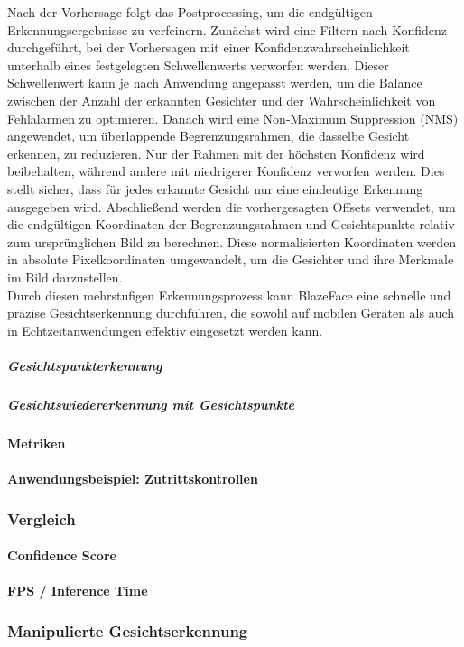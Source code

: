 Nach der Vorhersage folgt das Postprocessing, um die endgültigen Erkennungsergebnisse zu verfeinern. Zunächst wird eine Filtern nach Konfidenz durchgeführt, bei der Vorhersagen mit einer Konfidenzwahrscheinlichkeit unterhalb eines festgelegten Schwellenwerts verworfen werden. Dieser Schwellenwert kann je nach Anwendung angepasst werden, um die Balance zwischen der Anzahl der erkannten Gesichter und der Wahrscheinlichkeit von Fehlalarmen zu optimieren. Danach wird eine Non-Maximum Suppression (NMS) angewendet, um überlappende Begrenzungsrahmen, die dasselbe Gesicht erkennen, zu reduzieren. Nur der Rahmen mit der höchsten Konfidenz wird beibehalten, während andere mit niedrigerer Konfidenz verworfen werden. Dies stellt sicher, dass für jedes erkannte Gesicht nur eine eindeutige Erkennung ausgegeben wird. Abschließend werden die vorhergesagten Offsets verwendet, um die endgültigen Koordinaten der Begrenzungsrahmen und Gesichtspunkte relativ zum ursprünglichen Bild zu berechnen. Diese normalisierten Koordinaten werden in absolute Pixelkoordinaten umgewandelt, um die Gesichter und ihre Merkmale im Bild darzustellen. \\
Durch diesen mehrstufigen Erkennungsprozess kann BlazeFace eine schnelle und präzise Gesichtserkennung durchführen, die sowohl auf mobilen Geräten als auch in Echtzeitanwendungen effektiv eingesetzt werden kann.

\subparagraph{Gesichtspunkterkennung}
\subparagraph{Gesichtswiedererkennung mit Gesichtspunkte}
\paragraph{Metriken}
\paragraph{Anwendungsbeispiel: Zutrittskontrollen}

\subsubsection{Vergleich}
\paragraph{Confidence Score}
\paragraph{FPS / Inference Time}

\subsubsection{Manipulierte Gesichtserkennung}
